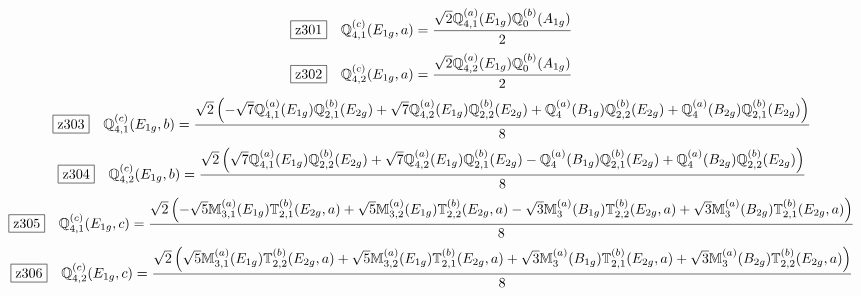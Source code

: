 \documentclass[fleqn,10pt,landscape]{jsarticle}
\begin{document}
\begin{dmath*}
\hspace*{3mm}\fbox{z301}\quad \mathbb{Q}_{4,1}^{(c)}(E_{1g},a)=\frac{\sqrt{2} \mathbb{Q}_{4,1}^{(a)}(E_{1g}) \mathbb{Q}_{0}^{(b)}(A_{1g})}{2}
\end{dmath*}
\begin{dmath*}
\hspace*{3mm}\fbox{z302}\quad \mathbb{Q}_{4,2}^{(c)}(E_{1g},a)=\frac{\sqrt{2} \mathbb{Q}_{4,2}^{(a)}(E_{1g}) \mathbb{Q}_{0}^{(b)}(A_{1g})}{2}
\end{dmath*}
\begin{dmath*}
\hspace*{3mm}\fbox{z303}\quad \mathbb{Q}_{4,1}^{(c)}(E_{1g},b)=\frac{\sqrt{2} \left(- \sqrt{7} \mathbb{Q}_{4,1}^{(a)}(E_{1g}) \mathbb{Q}_{2,1}^{(b)}(E_{2g}) + \sqrt{7} \mathbb{Q}_{4,2}^{(a)}(E_{1g}) \mathbb{Q}_{2,2}^{(b)}(E_{2g}) + \mathbb{Q}_{4}^{(a)}(B_{1g}) \mathbb{Q}_{2,2}^{(b)}(E_{2g}) + \mathbb{Q}_{4}^{(a)}(B_{2g}) \mathbb{Q}_{2,1}^{(b)}(E_{2g})\right)}{8}
\end{dmath*}
\begin{dmath*}
\hspace*{3mm}\fbox{z304}\quad \mathbb{Q}_{4,2}^{(c)}(E_{1g},b)=\frac{\sqrt{2} \left(\sqrt{7} \mathbb{Q}_{4,1}^{(a)}(E_{1g}) \mathbb{Q}_{2,2}^{(b)}(E_{2g}) + \sqrt{7} \mathbb{Q}_{4,2}^{(a)}(E_{1g}) \mathbb{Q}_{2,1}^{(b)}(E_{2g}) - \mathbb{Q}_{4}^{(a)}(B_{1g}) \mathbb{Q}_{2,1}^{(b)}(E_{2g}) + \mathbb{Q}_{4}^{(a)}(B_{2g}) \mathbb{Q}_{2,2}^{(b)}(E_{2g})\right)}{8}
\end{dmath*}
\begin{dmath*}
\hspace*{3mm}\fbox{z305}\quad \mathbb{Q}_{4,1}^{(c)}(E_{1g},c)=\frac{\sqrt{2} \left(- \sqrt{5} \mathbb{M}_{3,1}^{(a)}(E_{1g}) \mathbb{T}_{2,1}^{(b)}(E_{2g},a) + \sqrt{5} \mathbb{M}_{3,2}^{(a)}(E_{1g}) \mathbb{T}_{2,2}^{(b)}(E_{2g},a) - \sqrt{3} \mathbb{M}_{3}^{(a)}(B_{1g}) \mathbb{T}_{2,2}^{(b)}(E_{2g},a) + \sqrt{3} \mathbb{M}_{3}^{(a)}(B_{2g}) \mathbb{T}_{2,1}^{(b)}(E_{2g},a)\right)}{8}
\end{dmath*}
\begin{dmath*}
\hspace*{3mm}\fbox{z306}\quad \mathbb{Q}_{4,2}^{(c)}(E_{1g},c)=\frac{\sqrt{2} \left(\sqrt{5} \mathbb{M}_{3,1}^{(a)}(E_{1g}) \mathbb{T}_{2,2}^{(b)}(E_{2g},a) + \sqrt{5} \mathbb{M}_{3,2}^{(a)}(E_{1g}) \mathbb{T}_{2,1}^{(b)}(E_{2g},a) + \sqrt{3} \mathbb{M}_{3}^{(a)}(B_{1g}) \mathbb{T}_{2,1}^{(b)}(E_{2g},a) + \sqrt{3} \mathbb{M}_{3}^{(a)}(B_{2g}) \mathbb{T}_{2,2}^{(b)}(E_{2g},a)\right)}{8}
\end{dmath*}
\end{document}
